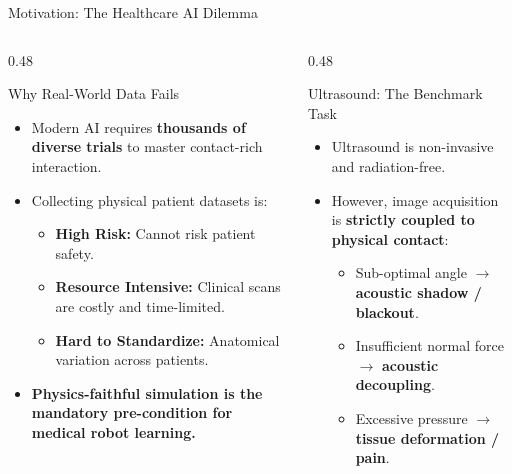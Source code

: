 \documentclass[aspectratio=169, 10pt]{beamer}
\begin{document}
\begin{frame}{Motivation: The Healthcare AI Dilemma}
    \begin{columns}[T]
        \begin{column}{0.48\textwidth}
            \begin{block}{Why Real-World Data Fails}
                \begin{itemize}
                    \item Modern AI requires \textbf{thousands of diverse trials} to master contact-rich interaction.
                    \item Collecting physical patient datasets is:
                    \begin{itemize}
                        \item \textbf{High Risk:} Cannot risk patient safety.
                        \item \textbf{Resource Intensive:} Clinical scans are costly and time-limited.
                        \item \textbf{Hard to Standardize:} Anatomical variation across patients.
                    \end{itemize}
                    \item \textbf{Physics-faithful simulation is the mandatory pre-condition for medical robot learning.}
                \end{itemize}
            \end{block}
        \end{column}
        \begin{column}{0.48\textwidth}
            \begin{alertblock}{Ultrasound: The Benchmark Task}
                \begin{itemize}
                    \item Ultrasound is non-invasive and radiation-free.
                    \item However, image acquisition is \textbf{strictly coupled to physical contact}:
                    \begin{itemize}
                        \item Sub-optimal angle $\to$ \textbf{acoustic shadow / blackout}.
                        \item Insufficient normal force $\to$ \textbf{acoustic decoupling}.
                        \item Excessive pressure $\to$ \textbf{tissue deformation / pain}.

\end{itemize}
\end{itemize}
\end{alertblock}
\end{column}
\end{columns}
\end{frame}
\end{document}
